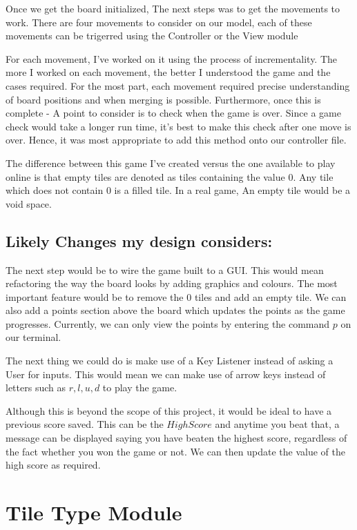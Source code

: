 \documentclass[12pt]{article}
\begin{document}
Once we get the board initialized, The next steps was to get the movements to work. There
are four movements to consider on our model, each of these movements can be trigerred using the Controller or the View module

For each movement, I've worked on it using the process of incrementality. The more I worked on each movement, the better I understood the game and the cases required. For the most part,
each movement required precise understanding of board positions and when merging is possible. Furthermore, once this is complete - A point to consider is to check when the game is over. Since a game check would take a longer run time, it's best to make this check after one move is over. Hence, it was most appropriate to add this method onto our controller file.

The difference between this game I've created versus the one available to play online is that empty tiles are denoted as tiles containing the value 0. Any tile which does not contain 0 is a filled tile. In a real game, An empty tile would be a void space.

\subsection*{Likely Changes my design considers:}

The next step would be to wire the game built to a GUI. This would mean refactoring the way the board looks by adding graphics and colours. The most important feature would be to remove the $0$ tiles and add an empty tile. We can also add a points section above the board which updates the points as the game progresses. Currently, we can only view the points by entering the command $p$ on our terminal.

The next thing we could do is make use of a Key Listener instead of asking a User for inputs. This would mean we can make use of arrow keys instead of letters such as $r, l, u, d$ to play the game.

Although this is beyond the scope of this project, it would be ideal to have a previous score saved. This can be the $High Score$ and anytime you beat that, a message can be displayed saying you have beaten the highest score, regardless of the fact whether you won the game or not. We can then update the value of the high score as required.

\newpage

\section* {Tile Type Module}
\end{document}

